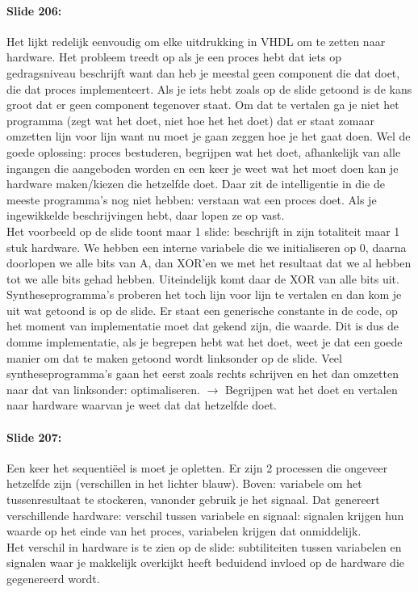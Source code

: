 \documentclass[10pt,a4paper]{book}
\begin{document}
\paragraph{Slide 206:} Het lijkt redelijk eenvoudig om elke uitdrukking in VHDL om te zetten naar hardware. Het probleem treedt op als je een proces hebt dat iets op gedragsniveau beschrijft want dan heb je meestal geen component die dat doet, die dat proces implementeert. Als je iets hebt zoals op de slide getoond is de kans groot dat er geen component tegenover staat. Om dat te vertalen ga je niet het programma (zegt wat het doet, niet hoe het het doet) dat er staat zomaar omzetten lijn voor lijn want nu moet je gaan zeggen hoe je het gaat doen. Wel de goede oplossing: proces bestuderen, begrijpen wat het doet, afhankelijk van alle ingangen die aangeboden worden en een keer je weet wat het moet doen kan je hardware maken/kiezen die hetzelfde doet. Daar zit de intelligentie in die de meeste programma's nog niet hebben: verstaan wat een proces doet. Als je ingewikkelde beschrijvingen hebt, daar lopen ze op vast.\\
Het voorbeeld op de slide toont maar 1 slide: beschrijft in zijn totaliteit maar 1 stuk hardware. We hebben een interne variabele die we initialiseren op 0, daarna doorlopen we alle bits van A, dan XOR'en we met het resultaat dat we al hebben tot we alle bits gehad hebben. Uiteindelijk komt daar de XOR van alle bits uit. Syntheseprogramma's proberen het toch lijn voor lijn te vertalen en dan kom je uit wat getoond is op de slide. Er staat een generische constante in de code, op het moment van implementatie moet dat gekend zijn, die waarde. Dit is dus de domme implementatie, als je begrepen hebt wat het doet, weet je dat een goede manier om dat te maken getoond wordt linksonder op de slide. Veel syntheseprogramma's gaan het eerst zoals rechts schrijven en het dan omzetten naar dat van linksonder: optimaliseren. $\rightarrow$ Begrijpen wat het doet en vertalen naar hardware waarvan je weet dat dat hetzelfde doet.

\paragraph{Slide 207:} Een keer het sequenti\"eel is moet je opletten. Er zijn 2 processen die ongeveer hetzelfde zijn (verschillen in het lichter blauw). Boven: variabele om het tussenresultaat te stockeren, vanonder gebruik je het signaal. Dat genereert verschillende hardware: verschil tussen variabele en signaal: signalen krijgen hun waarde op het einde van het proces, variabelen krijgen dat onmiddelijk.\\
Het verschil in hardware is te zien op de slide: subtiliteiten tussen variabelen en signalen waar je makkelijk overkijkt heeft beduidend invloed op de hardware die gegenereerd wordt.
\end{document}
